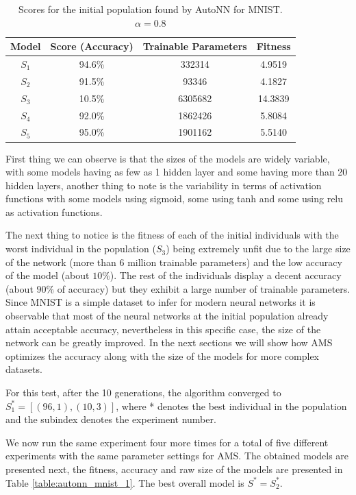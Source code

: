 \documentclass[journal]{IEEEtran}
\begin{document}
\begin{table}[!htb]
\begin{center}
\begin{tabular}{| c | c | c | c |}
\hline
Model & Score (Accuracy) & Trainable Parameters & Fitness\\
\hline
$S_1$ & 94.6\% & 332314 & 4.9519\\
$S_2$ & 91.5\% & 93346 & 4.1827\\
$S_3$ & 10.5\% & 6305682 & 14.3839\\
$S_4$ & 92.0\% & 1862426 & 5.8084\\
$S_5$ & 95.0\% & 1901162 & 5.5140\\
\hline
\end{tabular}
\end{center}
\caption{Scores for the initial population found by AutoNN for MNIST. $\alpha = 0.8$}
\label{table:autonn_mnist_initial}
\end{table} 

First thing we can observe is that the sizes of the models are widely variable, with some models having as few as 1 hidden layer and some having more than 20 hidden layers, another thing to note is the variability in terms of activation functions with some models using sigmoid, some using tanh and some using relu as activation functions.

The next thing to notice is the fitness of each of the initial individuals with the worst individual in the population ($S_3$) being extremely unfit due to the large size of the network (more than 6 million trainable parameters) and the low accuracy of the model (about $10\%$). The rest of the individuals display a decent accuracy (about $90\%$ of accuracy) but they exhibit a large number of trainable parameters. Since MNIST is a simple dataset to infer for modern neural networks it is observable that most of the neural networks at the initial population already attain acceptable accuracy, nevertheless in this specific case, the size of the network can be greatly improved. In the next sections we will show how AMS optimizes the accuracy along with the size of the models for more complex datasets.

For this test, after the 10 generations, the algorithm converged to $S^*_1 = \left[ (96, 1), (10, 3) \right]$, where * denotes the best individual in the population and the subindex denotes the experiment number.

We now run the same experiment four more times for a total of five different experiments with the same parameter settings for AMS. The obtained models are presented next, the fitness, accuracy and raw size of the models are presented in Table \ref{table:autonn_mnist_1}. The best overall model is $S^* = S^*_2$.
\end{document}
